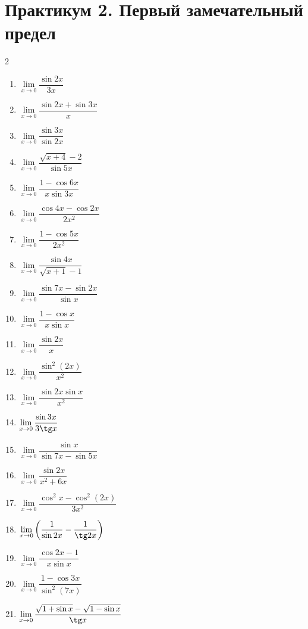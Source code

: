 \clearpage
\section*{Практикум 2. Первый замечательный предел}
\begin{multicols}{2}
\begin{enumerate}
\item$\lim\limits_{x\to0}\dfrac{\sin2x}{3x}$
\item$\lim\limits_{x\to0}\dfrac{\sin2x+\sin3x}{x}$
\item$\lim\limits_{x\to0}\dfrac{\sin3x}{\sin2x}$
\item$\lim\limits_{x\to0}\dfrac{\sqrt{x+4}-2}{\sin5x}$
\item$\lim\limits_{x\to0}\dfrac{1-\cos6x}{x\sin3x}$
\item$\lim\limits_{x\to0}\dfrac{\cos4x-\cos2x}{2x^2}$
\item$\lim\limits_{x\to0}\dfrac{1-\cos5x}{2x^2}$
\item$\lim\limits_{x\to0}\dfrac{\sin4x}{\sqrt{x+1}-1}$
\item$\lim\limits_{x\to0}\dfrac{\sin7x-\sin2x}{\sin x}$
\item$\lim\limits_{x\to0}\dfrac{1-\cos x}{x\sin x}$
\item$\lim\limits_{x\to0}\dfrac{\sin2x}{x}$
\item$\lim\limits_{x\to0}\dfrac{\sin^{2}(2x)}{x^2}$
\item$\lim\limits_{x\to0}\dfrac{\sin2x\sin x}{x^2}$
\item$\lim\limits_{x\to0}\dfrac{\sin3x}{3\tg x}$
\item$\lim\limits_{x\to0}\dfrac{\sin x}{\sin7x-\sin5x}$
\item$\lim\limits_{x\to0}\dfrac{\sin2x}{x^2+6x}$
\item$\lim\limits_{x\to0}\dfrac{\cos^{2}x-\cos^{2}(2x)}{3x^2}$
\item$\lim\limits_{x\to0}\left(\dfrac1{\sin2x}-\dfrac1{\tg2x}\right)$
\item$\lim\limits_{x\to0}\dfrac{\cos2x-1}{x\sin x}$
\item$\lim\limits_{x\to0}\dfrac{1-\cos3x}{\sin^{2}(7x)}$
\item$\lim\limits_{x\to0}\dfrac{\sqrt{1+\sin x}-\sqrt{1-\sin x}}{\tg x}$
\end{enumerate}
\end{multicols}

\clearpage

